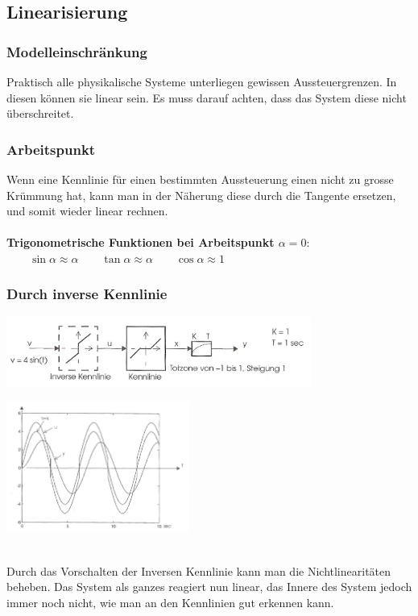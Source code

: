 	 
	
	\subsection{Linearisierung}
		\subsubsection{Modelleinschränkung}
			Praktisch alle physikalische Systeme unterliegen gewissen Aussteuergrenzen.
			In diesen können sie linear sein. Es muss darauf achten, dass  das System
			diese nicht überschreitet.
			
		\subsubsection{Arbeitspunkt}
			Wenn eine Kennlinie für einen bestimmten Aussteuerung einen nicht zu grosse
			Krümmung hat, kann man in der Näherung diese durch die Tangente ersetzen, und
			somit wieder linear rechnen. \\ \\
			\textbf{Trigonometrische Funktionen bei Arbeitspunkt $\alpha = 0$}: $\qquad \sin \alpha \approx
			\alpha \qquad \tan \alpha \approx \alpha \qquad \cos \alpha \approx 1$
		\subsubsection{Durch inverse Kennlinie}
		\begin{minipage}{11cm}
			\includegraphics[width=10cm]{./bilder/Kennlinienkompensation.jpg}
        \end{minipage}
		\begin{minipage}{6cm}
        	\includegraphics[width=6cm]{./bilder/Kennlinienkompensation_dia.jpg}
        \end{minipage}\\
			Durch das Vorschalten der Inversen Kennlinie kann man die Nichtlinearitäten
			beheben. Das System als ganzes reagiert nun linear, das Innere des System
			jedoch immer noch nicht, wie man an den Kennlinien gut erkennen kann.
			
